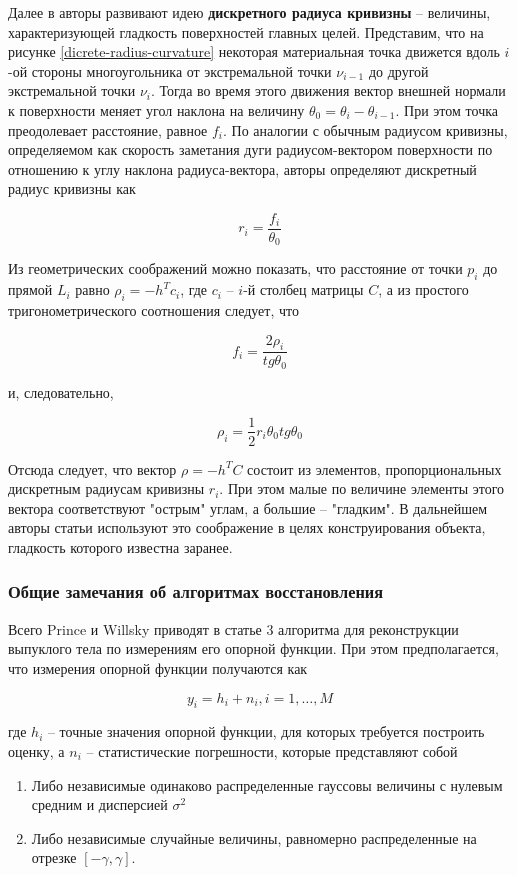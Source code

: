 \documentclass[a4paper,12pt, titlepage]{article}
\begin{document}
Далее в авторы развивают идею \textbf{дискретного радиуса кривизны} -- величины,
характеризующей гладкость поверхностей главных целей. Представим, что на
рисунке \ref{dicrete-radius-curvature} некоторая материальная точка движется
вдоль $i$-ой стороны многоугольника от экстремальной точки $\nu_{i - 1}$ до
другой экстремальной точки $\nu_{i}$. Тогда во время этого движения вектор
внешней нормали к поверхности меняет угол наклона на величину
$\theta_{0} = \theta_{i} - \theta_{i - 1}$. При этом точка преодолевает
расстояние, равное $f_{i}$. По аналогии с обычным радиусом кривизны,
определяемом как скорость заметания дуги радиусом-вектором поверхности по
отношению к углу наклона радиуса-вектора, авторы определяют дискретный радиус
кривизны как

$$
r_{i} = \frac{f_{i}}{\theta_{0}}
$$

Из геометрических соображений можно показать, что расстояние от точки $p_{i}$
до прямой $L_{i}$ равно $\rho_{i} = -h^{T} c_{i}$, где $c_{i}$ -- $i$-й столбец
матрицы $C$, а из простого тригонометрического соотношения следует, что

$$
f_{i} = \frac{2 \rho_{i}}{tg \theta_{0}}
$$

и, следовательно,

$$
\rho_{i} = \frac{1}{2} r_{i} \theta_{0} tg \theta_{0}
$$

Отсюда следует, что вектор $\rho = - h^{T} C$ состоит из элементов,
пропорциональных дискретным радиусам кривизны $r_{i}$. При этом малые по
величине элементы этого вектора соответствуют "острым" углам, а большие --
"гладким". В дальнейшем авторы статьи используют это соображение в целях
конструирования объекта, гладкость которого известна заранее.

\subsubsection{Общие замечания об алгоритмах восстановления}

Всего Prince и Willsky приводят в статье 3 алгоритма для реконструкции выпуклого
тела по измерениям его опорной функции. При этом предполагается, что измерения
опорной функции получаются как

$$
y_{i} = h_{i} + n_{i}, i = 1, \ldots, M
$$

где $h_{i}$ -- точные значения опорной функции, для которых требуется построить
оценку, а $n_{i}$ -- статистические погрешности, которые представляют собой

\begin{enumerate}
 \item Либо независимые одинаково распределенные гауссовы величины с нулевым
 средним и дисперсией $\sigma^{2}$
 \item Либо независимые случайные величины, равномерно распределенные на отрезке
 $[ - \gamma, \gamma]$.
\end{enumerate}
\end{document}
